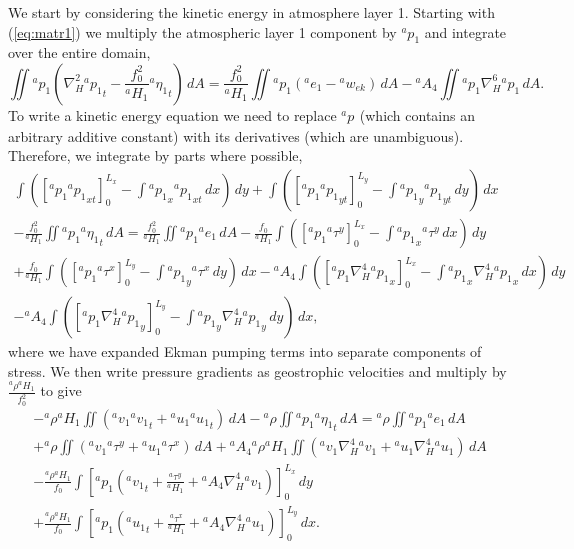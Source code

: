 \documentclass[11pt, a4paper,twoside]{article}
\newcommand{\etb}[2]{{{}^{#1}\eta_{#2}}}
\newcommand{\rhb}[1]{{{}^{#1}\rho}}
\newcommand{\p}[2]{{{}^{#1}p_{#2}}}
\newcommand{\uu}[2]{{{}^{#1}u_{#2}}}
\newcommand{\vv}[2]{{{}^{#1}v_{#2}}}
\newcommand{\ek}[1]{{{}^{#1}w_{ek}}}
\newcommand{\HH}[2]{{{}^{#1}H_{#2}}}
\newcommand{\ah}[1]{{{}^{#1}A_4}}
\newcommand{\e}[2]{{{}^{#1}e_{#2}}}
\newcommand{\tx}[2]{{}^{#1}\tau^{#2}}
\numberwithin{equation}{section}
\begin{document}
We start by considering the kinetic energy in atmosphere layer 1.
Starting with (\ref{eq:matr1}) we multiply the atmospheric layer 1 component by $\p{a}{1}$ and integrate over the entire domain,
\begin{equation}
\iint \p{a}{1}\left(\nabla_H^2\p{a}{1}_t - \frac{f_0^2}{\HH{a}{1}}\etb{a}{1}_t \right)\, dA =  \frac{f_0^2}{\HH{a}{1}}\iint \p{a}{1}(\e{a}{1} - \ek{a}) \, dA - \ah{a} \iint \p{a}{1}\nabla_H^6 \p{a}{1} \,dA.
\end{equation}
To write a kinetic energy equation we need to replace $\p{a}{}$ (which contains an arbitrary additive constant) with its derivatives (which are unambiguous).
Therefore, we integrate by parts where possible,
\begin{multline}
\int \left( [\p{a}{1} \p{a}{1}_{xt}]_0^{L_x} - \int \p{a}{1}_x \p{a}{1}_{xt} \, dx \right) \, dy + \int \left([\p{a}{1}\p{a}{1}_{yt}]_0^{L_y} - \int \p{a}{1}_y\p{a}{1}_{yt} \, dy \right)\, dx \\
- \frac{f_0^2}{\HH{a}{1}}\iint\p{a}{1}\etb{a}{1}_t \, dA =  \frac{f_0^2}{\HH{a}{1}}\iint\p{a}{1}\e{a}{1} \, dA - \frac{f_0}{\HH{a}{1}} \int \left( [\p{a}{1}\tx{a}{y}]_0^{L_x} - \int\p{a}{1}_x\tx{a}{y} \, dx\right) \, dy \\
+ \frac{f_0}{\HH{a}{1}} \int \left( [\p{a}{1}\tx{a}{x}]_0^{L_y} - \int\p{a}{1}_y\tx{a}{x}\, dy\right) \, dx - \ah{a} \int \left( [\p{a}{1}\nabla_H^4 \p{a}{1}_{x}]_0^{L_x} - \int \p{a}{1}_x \nabla_H^4 \p{a}{1}_{x} \, dx \right)\,dy\\
-\ah{a} \int \left( [\p{a}{1} \nabla_H^4 \p{a}{1}_{y}]_0^{L_y} - \int \p{a}{1}_y \nabla_H^4 \p{a}{1}_{y} \,dy \right) \, dx,
\end{multline}
where we have expanded Ekman pumping terms into separate components of stress.
We then write pressure gradients as geostrophic velocities and multiply by $\tfrac{\rhb{a}\HH{a}{1}}{f_0^2}$ to give
\begin{multline}
 -\rhb{a}\HH{a}{1} \iint \left(\vv{a}{1} \vv{a}{1}_{t} + \uu{a}{1}\uu{a}{1}_{t} \right)\, dA - \rhb{a}\iint\p{a}{1}\etb{a}{1}_t \, dA = \rhb{a}\iint\p{a}{1} \e{a}{1} \, dA \\
+ \rhb{a} \iint \left( \vv{a}{1}\tx{a}{y} + \uu{a}{1}\tx{a}{x}\right) \, dA + \ah{a}\rhb{a}\HH{a}{1}  \iint \left( \vv{a}{1} \nabla_H^4 \vv{a}{1} + \uu{a}{1} \nabla_H^4 \uu{a}{1} \right) \,dA \\
- \frac{\rhb{a}\HH{a}{1}}{f_0}\int \left[\p{a}{1}\left( \vv{a}{1}_t + \frac{\tx{a}{y}}{\HH{a}{1}}  + \ah{a}\nabla_H^4 \vv{a}{1}\right)\right]_0^{L_x} \,dy \\
+ \frac{\rhb{a}\HH{a}{1}}{f_0} \int \left[\p{a}{1} \left(\uu{a}{1}_t + \frac{\tx{a}{x}}{\HH{a}{1}}  + \ah{a}\nabla_H^4 \uu{a}{1}\right)\right]_0^{L_y} \,dx.
\end{multline}
\end{document}
